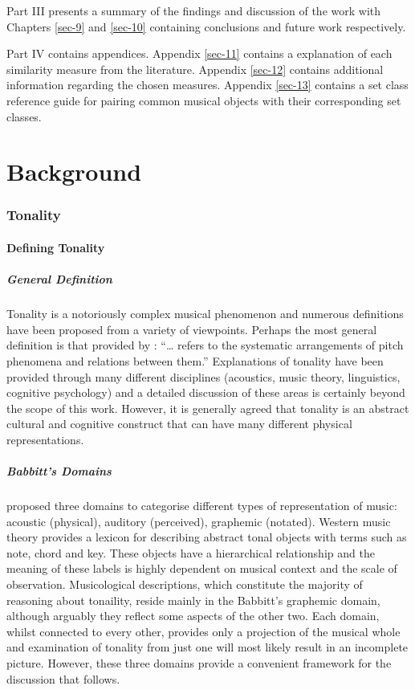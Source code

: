 \documentclass{article}
\begin{document}
Part III presents a summary of the findings and discussion of the work
with Chapters \ref{sec-9} and \ref{sec-10} containing conclusions and
future work respectively.

Part IV contains appendices. Appendix \ref{sec-11}
contains a explanation of each similarity measure from the
literature. Appendix \ref{sec-12} contains
additional information regarding the chosen measures. Appendix \ref{sec-13} contains a set class reference guide for pairing
common musical objects with their corresponding set classes.

\clearpage
\part{Background}
\section{Tonality}
\label{sec-2}
\subsection{Defining Tonality}
\label{sec-2-1}
\subsubsection{General Definition}
\label{sec-2-1-1}

Tonality is a notoriously complex musical phenomenon and numerous
definitions have been proposed from a variety of viewpoints. Perhaps
the most general definition is that provided by \citet{Hyer2013}:
``\ldots{} refers to the systematic arrangements of pitch phenomena and
relations between them.'' Explanations of tonality have been provided
through many different disciplines (acoustics, music theory,
linguistics, cognitive psychology) and a detailed discussion of these
areas is certainly beyond the scope of this work. However, it is
generally agreed that tonality is an abstract cultural and cognitive
construct that can have many different physical representations.
\subsubsection{Babbitt's Domains}
\label{sec-2-1-2}

\citet{Babbitt1965} proposed three domains to categorise different
types of representation of music: acoustic (physical), auditory
(perceived), graphemic (notated). Western music theory provides a
lexicon for describing abstract tonal objects with terms such as note,
chord and key. These objects have a hierarchical relationship and the
meaning of these labels is highly dependent on musical context and the
scale of observation. Musicological descriptions, which constitute the
majority of reasoning about tonaility, reside mainly in the Babbitt's
graphemic domain, although arguably they reflect some aspects of the
other two. Each domain, whilst connected to every other, provides only
a projection of the musical whole and examination of tonality from
just one will most likely result in an incomplete picture. However,
these three domains provide a convenient framework for the discussion
that follows.
\end{document}
